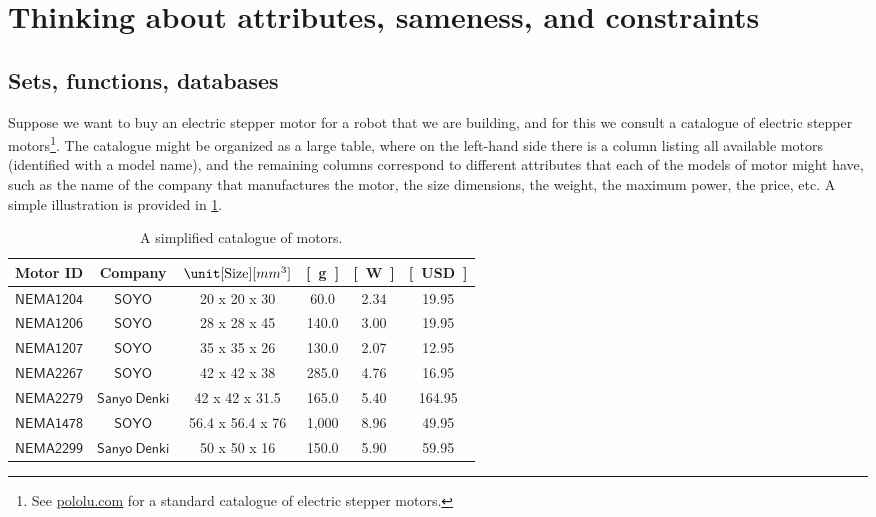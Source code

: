 \section{Thinking about attributes, sameness, and constraints}


\subsection{Sets, functions, databases}

Suppose we want to buy an electric stepper motor for a robot that we are building, and for this we consult a catalogue of electric stepper motors\footnote{See \href{https://www.pololu.com/category/87/stepper-motors}{pololu.com} for a standard catalogue of electric stepper motors.}. The catalogue might be organized as a large table, where on the left-hand side there is a column listing all available motors (identified with a model name), and the remaining columns correspond to different attributes that each of the models of motor might have, such as the name of the company that manufactures the motor, the size dimensions, the weight, the maximum power, the price, etc. A simple illustration is provided in \cref{tab:currencycompanies}.
\begin{table}[h]
    \centering
    \begin{tabular}{c|c|c|c|c|c}
         Motor ID & Company& $\unit[\text{Size}]{[mm^3]}$ & \unit[Weight]{[g]} & \unit[Max Power]{[W]} & \unit[Cost]{[USD]} \\
         \hline
         $\mathsf{NEMA1204}$&$\mathsf{SOYO}$ & 20 x 20 x 30& 60.0 &2.34 &19.95\\
         $\mathsf{NEMA1206}$&$\mathsf{SOYO}$ &28 x 28 x 45& 140.0 &3.00 &19.95\\
         $\mathsf{NEMA1207}$&$\mathsf{SOYO}$ &35 x 35 x 26& 130.0 &2.07 &12.95\\
         $\mathsf{NEMA2267}$&$\mathsf{SOYO}$ &42 x 42 x 38& 285.0 &4.76 &16.95\\
         $\mathsf{NEMA2279}$&$\mathsf{Sanyo \ Denki}$ &42 x 42 x 31.5& 165.0  &5.40 & 164.95\\
        $\mathsf{NEMA1478}$&$\mathsf{SOYO}$ & 56.4 x 56.4 x 76& 1,000 & 8.96&49.95\\
        $\mathsf{NEMA2299}$&$\mathsf{Sanyo\ Denki}$ & 50 x 50 x 16& 150.0 &5.90&59.95
    \end{tabular}
    \caption{A simplified catalogue of motors.}
    \label{tab:currencycompanies}
\end{table}

